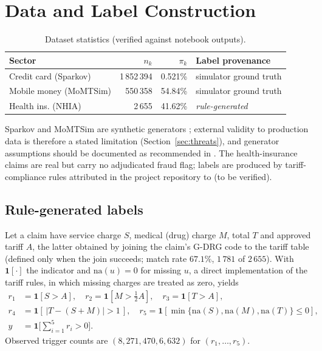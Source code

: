 \documentclass[journal]{IEEEtran}
\newcommand{\1}{\mathbf{1}}
\begin{document}
\section{Data and Label Construction}\label{sec:labels}
\begin{table}[t]
\centering
\caption{Dataset statistics (verified against notebook outputs).}
\label{tab:data}
\small
\begin{tabular}{@{}lrrl@{}}
\toprule
Sector & $n_k$ & $\pi_k$ & Label provenance \\
\midrule
Credit card (Sparkov) & 1\,852\,394 & 0.521\% & simulator ground truth \\
Mobile money (MoMTSim) & 550\,358 & 54.84\% & simulator ground truth \\
Health ins. (NHIA) & 2\,655 & 41.62\% & \emph{rule-generated} \\
\bottomrule
\end{tabular}
\end{table}
Sparkov and MoMTSim are synthetic generators \cite{sparkov,azamuke2022momtsim}; external validity to production data is therefore a stated limitation (Section~\ref{sec:threats}), and generator assumptions should be documented as recommended in \cite{altman2023realistic}. The health-insurance claims are real but carry no adjudicated fraud flag; labels are produced by tariff-compliance rules attributed in the project repository to \cite{sowah2019dss} (to be verified).

\subsection{Rule-generated labels}
Let a claim have service charge $S$, medical (drug) charge $M$, total $T$ and approved tariff $A$, the latter obtained by joining the claim's G-DRG code to the tariff table (defined only when the join succeeds; match rate $67.1\%$, $1\,781$ of $2\,655$). With $\1[\cdot]$ the indicator and $\mathrm{na}(u)=0$ for missing $u$, a direct implementation of the tariff rules, in which missing charges are treated as zero, yields
\begin{align}
r_1&=\1[S>A],\quad r_2=\1[M>\tfrac12A],\quad r_3=\1[T>A],\nonumber\\
r_4&=\1[\,|T-(S+M)|>1\,],\quad r_5=\1[\min\{\mathrm{na}(S),\mathrm{na}(M),\mathrm{na}(T)\}\le 0],\nonumber\\
y&=\1\Big[\textstyle\sum_{i=1}^5 r_i>0\Big]. \label{eq:rules}
\end{align}
Observed trigger counts are $(8,271,470,6,632)$ for $(r_1,\dots,r_5)$.
\end{document}
